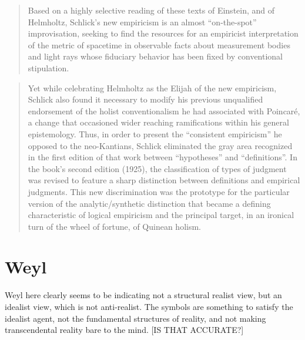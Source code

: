 \begin{quote}
    Based on a highly selective reading of these texts of Einstein, and of Helmholtz, Schlick's new empiricism is an almost ``on-the-spot'' improvisation, seeking to find the resources for an empiricist interpretation of the metric of spacetime in observable facts about measurement bodies and light rays whose fiduciary behavior has been fixed by conventional stipulation.
    
    \citep[p. 52]{Ryckman2005}
\end{quote}

\begin{quote}
    Yet while celebrating Helmholtz as the Elijah of the new empiricism, Schlick also found it necessary to modify his previous unqualified endorsement of the holist conventionalism he had associated with Poincar\'e, a change that occasioned wider reaching ramifications within his general epistemology.  Thus, in order to present the ``consistent empiricism'' he opposed to the neo-Kantians, Schlick eliminated the gray area recognized in the first edition of that work between ``hypotheses'' and ``definitions''.  In the book's second edition (1925), the classification of types of judgment was revised to feature a sharp distinction between definitions and empirical judgments.  This new discrimination was the prototype for the particular version of the analytic/synthetic distinction that became a defining characteristic of logical empiricism and the principal target, in an ironical turn of the wheel of fortune, of Quinean holism.
    
    \citep[p. 52-53]{Ryckman2005}
\end{quote}


\section{Weyl}

Weyl here clearly seems to be indicating not a structural realist view, but an idealist view, which is not anti-realist.  The symbols are something to satisfy the idealist agent, not the fundamental structures of reality, and not making transcendental reality bare to the mind.  [IS THAT ACCURATE?]

